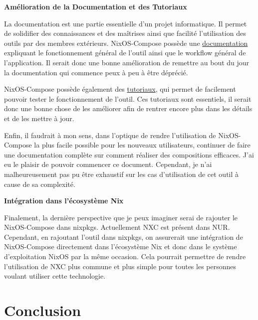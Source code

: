 \documentclass[a4paper,french,12pt, titlepage]{article}
\begin{document}
\textbf{Amélioration de la Documentation et des Tutoriaux}\newline

La documentation est une partie essentielle d'un projet informatique. Il
permet de solidifier des connaissances et des maîtrises ainsi que
facilité l'utilisation des outils par des membres extérieurs.
NixOS-Compose possède une
\href{https://nixos-compose.gitlabpages.inria.fr/nixos-compose/}{documentation}
expliquant le fonctionnement général de l'outil ainsi que le workflow
général de l'application. Il serait donc une bonne amélioration de
remettre au bout du jour la documentation qui commence peux à peu à être
déprécié.\newline

NixOS-Compose possède également des
\href{https://gitlab.inria.fr/nixos-compose/tuto-nxc}{tutoriaux}, qui
permet de facilement pouvoir tester le fonctionnement de l'outil. Ces
tutoriaux sont essentiels, il serait donc une bonne chose de les
améliorer afin de rentrer encore plus dans les détails et de les mettre
à jour. \newline

Enfin, il faudrait à mon sens, dans l'optique de rendre l'utilisation de
NixOS-Compose la plus facile possible pour les nouveaux utilisateurs,
continuer de faire une documentation complète sur comment réaliser des
compositions efficaces. J'ai eu le plaisir de pouvoir commencer ce
document. Cependant, je n'ai malheureusement pas pu être exhaustif sur
les cas d'utilisation de cet outil à cause de sa complexité.\newline

\textbf{Intégration dans l'écosystème Nix}\newline

Finalement, la dernière perspective que je peux imaginer serai de
rajouter le NixOS-Compose dans nixpkgs. Actuellement NXC est présent
dans NUR. Cependant, en rajoutant l'outil dans nixpkgs, on assurerait
une intégration de NixOS-Compose directement dans l'écosystème Nix et
donc dans le système d'exploitation NixOS par la même occasion. Cela
pourrait permettre de rendre l'utilisation de NXC plus commune et plus
simple pour toutes les personnes voulant utiliser cette
technologie.\newline

\newpage

\hypertarget{conclusion}{%
\section{Conclusion}\label{conclusion}}
\end{document}
